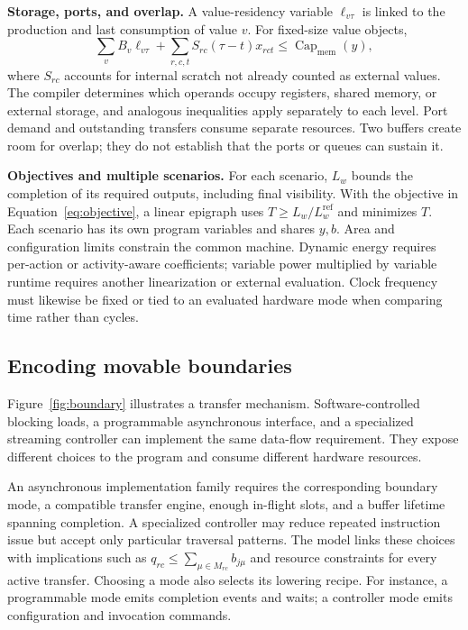 \textbf{Storage, ports, and overlap.}
A value-residency variable $\ell_{v\tau}$ is linked to the production and last consumption of value $v$. For fixed-size value objects,
\begin{equation}
 \sum_v B_v\ell_{v\tau}+\sum_{r,c,t}S_{rc}(\tau-t)x_{rct}
 \le\operatorname{Cap}_{\mathrm{mem}}(y),\label{eq:storage}
\end{equation}
where $S_{rc}$ accounts for internal scratch not already counted as external values. The compiler determines which operands occupy registers, shared memory, or external storage, and analogous inequalities apply separately to each level. Port demand and outstanding transfers consume separate resources. Two buffers create room for overlap; they do not establish that the ports or queues can sustain it.

\textbf{Objectives and multiple scenarios.}
For each scenario, $L_w$ bounds the completion of its required outputs, including final visibility. With the objective in Equation~\eqref{eq:objective}, a linear epigraph uses $T\ge L_w/L_w^{\mathrm{ref}}$ and minimizes $T$. Each scenario has its own program variables and shares $y,b$. Area and configuration limits constrain the common machine. Dynamic energy requires per-action or activity-aware coefficients; variable power multiplied by variable runtime requires another linearization or external evaluation. Clock frequency must likewise be fixed or tied to an evaluated hardware mode when comparing time rather than cycles.

\subsection{Encoding movable boundaries}\label{sec:boundary-example}
Figure~\ref{fig:boundary} illustrates a transfer mechanism. Software-controlled blocking loads, a programmable asynchronous interface, and a specialized streaming controller can implement the same data-flow requirement. They expose different choices to the program and consume different hardware resources.



An asynchronous implementation family requires the corresponding boundary mode, a compatible transfer engine, enough in-flight slots, and a buffer lifetime spanning completion. A specialized controller may reduce repeated instruction issue but accept only particular traversal patterns. The model links these choices with implications such as $q_{rc}\le\sum_{\mu\in M_{rc}}b_{j\mu}$ and resource constraints for every active transfer. Choosing a mode also selects its lowering recipe. For instance, a programmable mode emits completion events and waits; a controller mode emits configuration and invocation commands.

